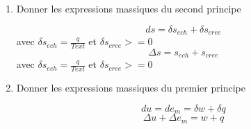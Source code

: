 \begin{enumerate}[label=\arabic{enumi} - , left=0pt, itemsep=1em]
    \item Donner les expressions massiques du second principe\par
    \begin{solution}
        \[ ds = \delta s_{ech} + \delta s_{cree}\] avec $\delta s_{ech} = \frac{q}{Text}$ et $ \delta s_{cree} >= 0$
        \[ \Delta s =  s_{ech} + s_{cree}\] avec $\delta s_{ech} = \frac{q}{Text}$ et $ \delta s_{cree} >= 0$
    \end{solution}

    \item Donner les expressions massiques du premier principe\par
    \begin{solution}
        \[ du = de_m = \delta w + \delta q \]
        \[ \Delta u + \Delta e_m = w + q\]
    \end{solution}
\end{enumerate}